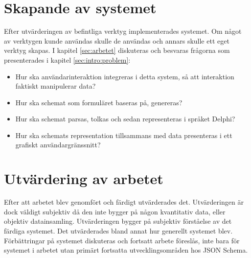 \section{Skapande av systemet}
\label{sec:metod:praktiska-frågor}
Efter utvärderingen av befintliga verktyg implementerades systemet. Om något av verktygen kunde användas skulle de användas och annars skulle ett eget verktyg skapas. I kapitel \ref{sec:arbetet} diskuteras och besvaras frågorna som presenterades i kapitel \ref{sec:intro:problem}:

\begin{itemize}
	\item Hur ska användarinteraktion integreras i detta system, så att interaktion faktiskt manipulerar data?
	\item Hur ska schemat som formuläret baseras på, genereras?
	\item Hur ska schemat parsas, tolkas och sedan representeras i språket Delphi?
	\item Hur ska schemats representation tillsammans med data presenteras i ett grafiskt användargränssnitt?
\end{itemize}

\section{Utvärdering av arbetet}
\label{sec:metod:utvärdering-arbetet}
Efter att arbetet blev genomfört och färdigt utvärderades det. Utvärderingen är dock väldigt subjektiv då den inte bygger på någon kvantitativ data, eller objektiv datainsamling. Utvärderingen bygger på subjektiv förståelse av det färdiga systemet. Det utvärderades bland annat hur generellt systemet blev. Förbättringar på systemet diskuteras och fortsatt arbete föreslås, inte bara för systemet i arbetet utan primärt fortsatta utvecklingsområden hos JSON Schema.